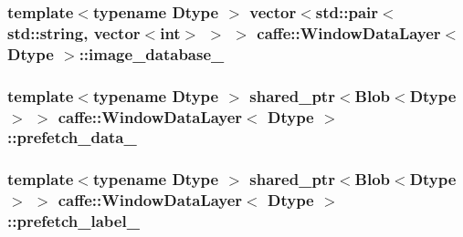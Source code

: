 \hypertarget{classcaffe_1_1_window_data_layer_a6b2fa458b81345ca8a65f8b473584ea8}{
\subsubsection[{image\+\_\+database\+\_\+}]{\setlength{\rightskip}{0pt plus 5cm}template$<$typename Dtype $>$ vector$<$std\+::pair$<$std\+::string, vector$<$int$>$ $>$ $>$ {\bf caffe\+::\+Window\+Data\+Layer}$<$ Dtype $>$\+::image\+\_\+database\+\_\+\hspace{0.3cm}{\ttfamily [protected]}}}\label{classcaffe_1_1_window_data_layer_a6b2fa458b81345ca8a65f8b473584ea8}
\hypertarget{classcaffe_1_1_window_data_layer_a7f49a5a0174aa586f6e7eac9a2304bf0}{
\subsubsection[{prefetch\+\_\+data\+\_\+}]{\setlength{\rightskip}{0pt plus 5cm}template$<$typename Dtype $>$ shared\+\_\+ptr$<${\bf Blob}$<$Dtype$>$ $>$ {\bf caffe\+::\+Window\+Data\+Layer}$<$ Dtype $>$\+::prefetch\+\_\+data\+\_\+\hspace{0.3cm}{\ttfamily [protected]}}}\label{classcaffe_1_1_window_data_layer_a7f49a5a0174aa586f6e7eac9a2304bf0}
\hypertarget{classcaffe_1_1_window_data_layer_a95ecf97b6510d6e3d55ded383f3fce3b}{
\subsubsection[{prefetch\+\_\+label\+\_\+}]{\setlength{\rightskip}{0pt plus 5cm}template$<$typename Dtype $>$ shared\+\_\+ptr$<${\bf Blob}$<$Dtype$>$ $>$ {\bf caffe\+::\+Window\+Data\+Layer}$<$ Dtype $>$\+::prefetch\+\_\+label\+\_\+\hspace{0.3cm}{\ttfamily [protected]}}}\label{classcaffe_1_1_window_data_layer_a95ecf97b6510d6e3d55ded383f3fce3b}
